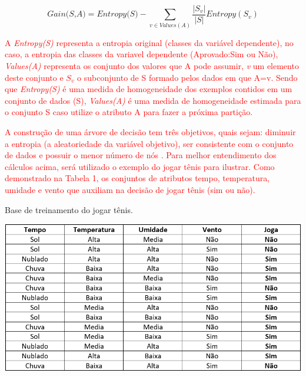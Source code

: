 \begin{equation}
    \label{eq:Ganho}
        {\textit{Gain(S,A)}={\textit{Entropy(S)} -  \sum_{v \in Values(A)} \frac{|S_v|}{|S|} Entropy(S_v) } }
\end{equation}

\par
\textcolor{red}{A \textit{Entropy(S)} representa a entropia original (classes da variável dependente), no caso, a entropia das classes da variavel dependente (Aprovado:Sim ou Não), \textit{Values(A)} representa os conjunto dos valores que A pode assumir, \textit{v} um elemento deste conjunto e $S_v$ o subconjunto de S formado pelos dados em que A=v. Sendo que \textit{Entropy(S)} é uma medida de homogeneidade  dos exemplos contidos em um conjunto de dados (S), \textit{Values(A)} é uma medida de homogeneidade estimada para o
conjunto S caso utilize o atributo A para fazer a próxima partição.}

\par
\textcolor{red}{A construção de uma árvore de decisão tem três objetivos, quais sejam: diminuir a entropia (a aleatoriedade da variável objetivo), ser consistente com o conjunto de dados e possuir o menor número de nós \cite{Steiner2004}. Para melhor entendimento dos cálculos acima, será utilizado o exemplo do jogar tênis para ilustrar. Como demonstrado na Tabela 1, os conjuntos de atributos tempo, temperatura, umidade e vento que auxiliam na decisão de jogar tênis (sim ou não).}

\par
\begin{table}[!htp]
	\begin{center}
    \caption{\label{fig:waveform_fig} Base de treinamento do jogar tênis.}
	\includegraphics[scale=0.65]{Figuras/Jogar_tenis.png}
	\end{center}
\end{table}

